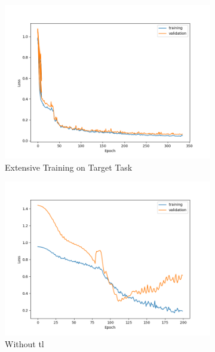 \begin{figure}[ht!]
    \centering
    \begin{subfigure}{0.48\textwidth}
        \includegraphics[width=\textwidth]{./project3/figures/figure1a.png}
        \caption{Extensive Training on Target Task} 
        \label{subfig3-1:extensive}
    \end{subfigure}\hfill
    \begin{subfigure}{0.48\textwidth}
        \includegraphics[width=\textwidth]{./project3/figures/figure1b.png}
        \caption{Without \gls{tl}}
        \label{subfig3-1:without}
    \end{subfigure}
    \begin{subfigure}{0.48\textwidth}

\end{subfigure}
\end{figure}
